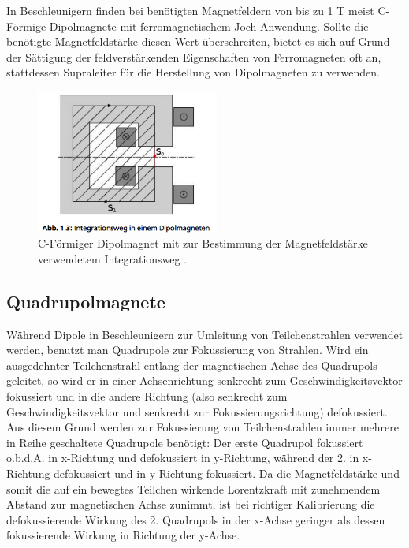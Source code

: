 \documentclass[bigchapter,colorback,accentcolor=tud4b,linedtoc,11pt]{tudreport}
\begin{document}
In Beschleunigern finden bei benötigten Magnetfeldern von bis zu 1 T meist C-Förmige Dipolmagnete mit ferromagnetischem Joch Anwendung. Sollte die benötigte Magnetfeldstärke diesen Wert überschreiten, bietet es sich auf Grund der Sättigung der feldverstärkenden Eigenschaften von Ferromagneten oft an, stattdessen Supraleiter für die Herstellung von Dipolmagneten zu verwenden.

\begin{figure}[H]
\centering
\includegraphics[width=60mm]{img/dipol.png}
\caption{C-Förmiger Dipolmagnet mit zur Bestimmung der Magnetfeldstärke verwendetem Integrationsweg \cite{anleitung}.}
\end{figure}

\subsection{Quadrupolmagnete}

Während Dipole in Beschleunigern zur Umleitung von Teilchenstrahlen verwendet werden, benutzt man Quadrupole zur Fokussierung von Strahlen. Wird ein ausgedehnter Teilchenstrahl entlang der  magnetischen Achse des Quadrupols geleitet, so wird er in einer Achsenrichtung senkrecht zum Geschwindigkeitsvektor fokussiert und in die andere Richtung (also senkrecht zum Geschwindigkeitsvektor und senkrecht zur Fokussierungsrichtung) defokussiert. Aus diesem Grund werden zur Fokussierung von Teilchenstrahlen immer mehrere in Reihe geschaltete Quadrupole benötigt: Der erste Quadrupol fokussiert o.b.d.A. in x-Richtung und defokussiert in y-Richtung, während der 2. in x-Richtung defokussiert und in y-Richtung fokussiert. Da die Magnetfeldstärke und somit die auf ein bewegtes Teilchen wirkende Lorentzkraft mit zunehmendem Abstand zur magnetischen Achse zunimmt, ist bei richtiger Kalibrierung die defokussierende Wirkung des 2. Quadrupols in der x-Achse geringer als dessen fokussierende Wirkung in Richtung der y-Achse.
\end{document}
